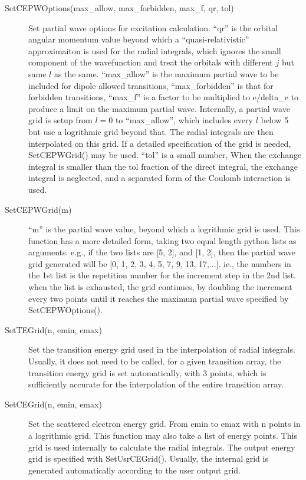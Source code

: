 \documentclass[12pt]{article}
\begin{document}
\begin{description}
\item[SetCEPWOptions(max\_allow, max\_forbidden, max\_f, qr, tol)] 
Set partial wave options for excitation calculation. ``qr'' is the orbital
angular momentum value beyond which a ``quasi-relativistic'' approximaiton
is used for the radial integrals, which ignores the small component of the
wavefunction and treat the orbitals with different $j$ but same $l$ as the
same. ``max\_allow'' is the maximum partial wave to be included for dipole
allowed transitions, ``max\_forbidden'' is that for forbidden transitions,
``max\_f'' is a factor to be multiplied to e/delta\_e to produce a limit on the
maximum partial wave. Internally, a partial wave grid is setup from $l = 0$ to 
``max\_allow'', which includes every $l$ below 5 but use a logrithmic grid
beyond 
that. The radial integrals are then interpolated on this grid. If
a detailed specification of the grid is needed, SetCEPWGrid() may be used.
``tol'' is a small number, When the exchange integral is smaller than the
tol fraction of the direct integral, the exchange integral is neglected, and a
separated form of the Coulomb interaction is used. 

\item[SetCEPWGrid(m)] 
``m'' is the partial wave value, beyond which a logrithmic
grid is used. This function has a more detailed form, taking two equal length
python lists as arguments. e.g., if the two lists are [5, 2], and [1, 2], then
the partial wave grid generated will be [0, 1, 2, 3, 4, 5, 7, 9, 13, 17,...].
ie., the numbers in the 1st list is the repetition number for the increment
step in the 2nd list. when the list is exhausted, the grid continues, by
doubling the increment every two points until it reaches the maximum partial
wave specified by SetCEPWOptions().

\item[SetTEGrid(n, emin, emax)] 
Set the transition energy grid used in the
interpolation of radial integrals. Usually, it does not need to be
called. for a given transition array, the transition energy grid is set
automatically, with 3 points, which is sufficiently accurate for the
interpolation of the entire transition array. 

\item[SetCEGrid(n, emin, emax)] 
Set the scattered electron energy grid. From emin to emax with n points in a
logrithmic grid. This function may also take a list of energy points. This
grid is used internally to calculate the radial integrals. The output energy
grid is specified with SetUsrCEGrid(). Usually, the internal grid is generated
automatically according to the user output grid. 


\end{description}
\end{document}
